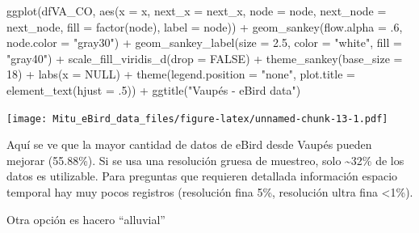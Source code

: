\documentclass[
]{article}
\newenvironment{Shaded}{\begin{snugshade}}{\end{snugshade}}
\newcommand{\AttributeTok}[1]{\textcolor[rgb]{0.77,0.63,0.00}{#1}}
\newcommand{\ConstantTok}[1]{\textcolor[rgb]{0.00,0.00,0.00}{#1}}
\newcommand{\DecValTok}[1]{\textcolor[rgb]{0.00,0.00,0.81}{#1}}
\newcommand{\FloatTok}[1]{\textcolor[rgb]{0.00,0.00,0.81}{#1}}
\newcommand{\FunctionTok}[1]{\textcolor[rgb]{0.00,0.00,0.00}{#1}}
\newcommand{\NormalTok}[1]{#1}
\newcommand{\SpecialCharTok}[1]{\textcolor[rgb]{0.00,0.00,0.00}{#1}}
\newcommand{\StringTok}[1]{\textcolor[rgb]{0.31,0.60,0.02}{#1}}
\begin{document}
\begin{Shaded}
\begin{Highlighting}[]
\FunctionTok{ggplot}\NormalTok{(dfVA\_CO, }\FunctionTok{aes}\NormalTok{(}\AttributeTok{x =}\NormalTok{ x, }\AttributeTok{next\_x =}\NormalTok{ next\_x, }\AttributeTok{node =}\NormalTok{ node, }\AttributeTok{next\_node =}\NormalTok{ next\_node, }\AttributeTok{fill =} \FunctionTok{factor}\NormalTok{(node), }\AttributeTok{label =}\NormalTok{ node)) }\SpecialCharTok{+}
  \FunctionTok{geom\_sankey}\NormalTok{(}\AttributeTok{flow.alpha =}\NormalTok{ .}\DecValTok{6}\NormalTok{,}
              \AttributeTok{node.color =} \StringTok{"gray30"}\NormalTok{) }\SpecialCharTok{+}
  \FunctionTok{geom\_sankey\_label}\NormalTok{(}\AttributeTok{size =} \FloatTok{2.5}\NormalTok{, }\AttributeTok{color =} \StringTok{"white"}\NormalTok{, }\AttributeTok{fill =} \StringTok{"gray40"}\NormalTok{) }\SpecialCharTok{+}
  \FunctionTok{scale\_fill\_viridis\_d}\NormalTok{(}\AttributeTok{drop =} \ConstantTok{FALSE}\NormalTok{) }\SpecialCharTok{+}
  \FunctionTok{theme\_sankey}\NormalTok{(}\AttributeTok{base\_size =} \DecValTok{18}\NormalTok{) }\SpecialCharTok{+}
  \FunctionTok{labs}\NormalTok{(}\AttributeTok{x =} \ConstantTok{NULL}\NormalTok{) }\SpecialCharTok{+}
  \FunctionTok{theme}\NormalTok{(}\AttributeTok{legend.position =} \StringTok{"none"}\NormalTok{,}
        \AttributeTok{plot.title =} \FunctionTok{element\_text}\NormalTok{(}\AttributeTok{hjust =}\NormalTok{ .}\DecValTok{5}\NormalTok{)) }\SpecialCharTok{+}
  \FunctionTok{ggtitle}\NormalTok{(}\StringTok{"Vaupés {-} eBird data"}\NormalTok{)}
\end{Highlighting}
\end{Shaded}

\texttt{[image: Mitu\_eBird\_data\_files/figure-latex/unnamed-chunk-13-1.pdf]}

Aquí se ve que la mayor cantidad de datos de eBird desde Vaupés pueden
mejorar (55.88\%). Si se usa una resolución gruesa de muestreo, solo
\textasciitilde32\% de los datos es utilizable. Para preguntas que
requieren detallada información espacio temporal hay muy pocos registros
(resolución fina 5\%, resolución ultra fina \textless1\%).

Otra opción es hacero ``alluvial''
\end{document}
